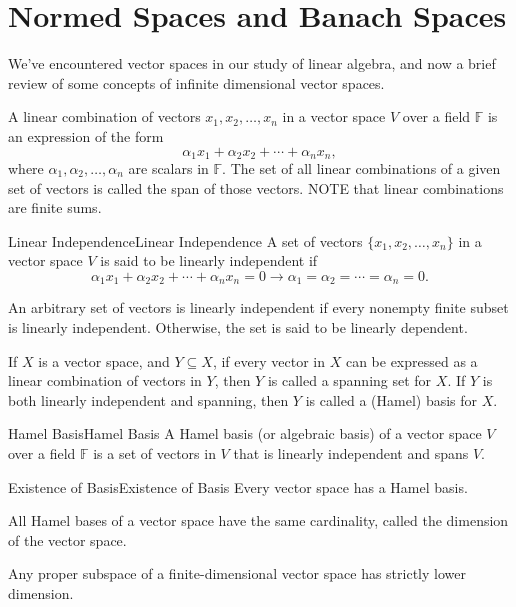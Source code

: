 \documentclass[../main.tex]{subfiles}
\begin{document}
\chapter{Normed Spaces and Banach Spaces}

We've encountered vector spaces in our study of linear algebra, and now a brief review of some concepts of infinite dimensional vector spaces.

A linear combination of vectors $x_1, x_2, \ldots, x_n$ in a vector space $V$ over a field $\mathbb{F}$ is an expression of the form
\begin{equation*}
	\alpha_1 x_1 + \alpha_2 x_2 + \cdots + \alpha_n x_n,
\end{equation*}
where $\alpha_1, \alpha_2, \ldots, \alpha_n$ are scalars in $\mathbb{F}$. The set of all linear combinations of a given set of vectors is called the span of those vectors. NOTE that linear combinations are finite sums.

\begin{definition}{Linear Independence}{Linear Independence}
	A set of vectors $\{x_1, x_2, \ldots, x_n\}$ in a vector space $V$ is said to be linearly independent if
	\begin{equation*}
		\alpha_1 x_1 + \alpha_2 x_2 + \cdots + \alpha_n x_n = 0 \rightarrow \alpha_1 = \alpha_2 = \cdots = \alpha_n = 0.
	\end{equation*}

	An arbitrary set of vectors is linearly independent if every nonempty finite subset is linearly independent. Otherwise, the set is said to be linearly dependent.
\end{definition}

If $X$ is a vector space, and $Y \subseteq X$, if every vector in $X$ can be expressed as a linear combination of vectors in $Y$, then $Y$ is called a spanning set for $X$. If $Y$ is both linearly independent and spanning, then $Y$ is called a (Hamel) basis for $X$.

\begin{definition}{Hamel Basis}{Hamel Basis}
	A Hamel basis (or algebraic basis) of a vector space $V$ over a field $\mathbb{F}$ is a set of vectors in $V$ that is linearly independent and spans $V$.
\end{definition}

\begin{theorem}{Existence of Basis}{Existence of Basis}
	Every vector space has a Hamel basis.

	All Hamel bases of a vector space have the same cardinality, called the dimension of the vector space.

	Any proper subspace of a finite-dimensional vector space has strictly lower dimension.
\end{theorem}
\end{document}
